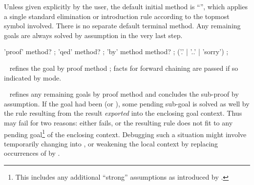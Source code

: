 \begin{isabellebody}
\begin{isamarkuptext}
  Unless given explicitly by the user, the default initial method is
  ``\hyperlink{method.rule}{\mbox{}}'', which applies a single standard elimination
  or introduction rule according to the topmost symbol involved.
  There is no separate default terminal method.  Any remaining goals
  are always solved by assumption in the very last step.

  \begin{rail}
    'proof' method?
    ;
    'qed' method?
    ;
    'by' method method?
    ;
    ('.' | '..' | 'sorry')
    ;
  \end{rail}

  \begin{description}
  
  \item \hyperlink{command.proof}{\mbox{}}~ refines the goal by proof
  method ; facts for forward chaining are passed if so
  indicated by  mode.
  
  \item \hyperlink{command.qed}{\mbox{}}~ refines any remaining goals by
  proof method  and concludes the sub-proof by assumption.
  If the goal had been  (or ), some
  pending sub-goal is solved as well by the rule resulting from the
  result \emph{exported} into the enclosing goal context.  Thus  may fail for two reasons: either  fails, or the
  resulting rule does not fit to any pending goal\footnote{This
  includes any additional ``strong'' assumptions as introduced by
  \hyperlink{command.assume}{\mbox{}}.} of the enclosing context.  Debugging such a
  situation might involve temporarily changing \hyperlink{command.show}{\mbox{}} into
  \hyperlink{command.have}{\mbox{}}, or weakening the local context by replacing
  occurrences of \hyperlink{command.assume}{\mbox{}} by \hyperlink{command.presume}{\mbox{}}.
  

\end{description}
\end{isamarkuptext}
\end{isabellebody}
